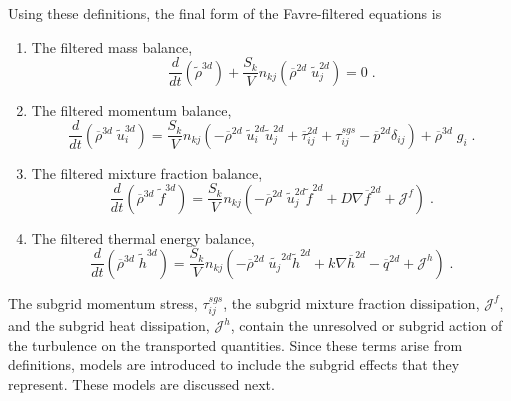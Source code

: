 Using these definitions, the final form of the Favre-filtered equations is
%
\begin{enumerate}
\item The filtered mass balance, 
%
\begin{equation}\label{eqn:filtered_mass_balance}
\frac{d}{d t} \left(\widetilde{\rho}^{3d} \right)   + \frac{S_k}{V} n_{kj} \left( \overline{\rho}^{2d} \; \widetilde{u}^{2d}_j \right) = 0 \; .
\end{equation}
%
\item The filtered momentum balance, 
%
\begin{equation}\label{eqn:filtered_mom_balance}
\frac{d}{d t} \left( \overline{\rho}^{3d} \; \widetilde{u}^{3d}_i \right) = \frac{S_{k}}{V} n_{kj}\left( -\overline{\rho}^{2d} \; \widetilde{u}^{2d}_i\widetilde{u}^{2d}_j + \overline{\tau}^{2d}_{ij} + \tau^{sgs}_{ij} - \overline{p}^{2d} \delta_{ij} \right) + \overline{\rho}^{3d} \; g_i  \; .
\end{equation}
%
\item The filtered mixture fraction balance,
%
\begin{equation}\label{eqn:filtered_mixfrac_balance}
\frac{d}{d t} \left( \overline{\rho}^{3d} \; \widetilde{f}^{3d} \right) = \frac{S_k}{V} n_{kj} \left( -\overline{\rho}^{2d} \; \widetilde{u}^{2d}_j \widetilde{f}^{2d} + D \nabla \overline{f}^{2d} + \mathcal{J}^{f} \right) \; .
\end{equation}
%
%
\item The filtered thermal energy balance, 
%
\begin{equation}\label{eqn:filtered_heat_balance}
\frac{d}{d t} \left( \overline{\rho}^{3d} \; \widetilde{h}^{3d} \right) = \frac{S_{k}}{V} n_{kj} \left( -\overline{\rho}^{2d} \; \widetilde{u_j}^{2d}\widetilde{h}^{2d} + k \nabla \overline{h}^{2d}  - \overline{q}^{2d}  + \mathcal{J}^h \right) \; .
\end{equation}
%
\end{enumerate}
The subgrid momentum stress, $\tau_{ij}^{sgs}$, the subgrid mixture fraction dissipation, $\mathcal{J}^{f}$, and the subgrid heat dissipation, $\mathcal{J}^{h}$, contain the unresolved or subgrid action of the turbulence on the transported quantities.  Since these terms arise from definitions, models are introduced to include the subgrid effects that they represent.  These models are discussed next.


